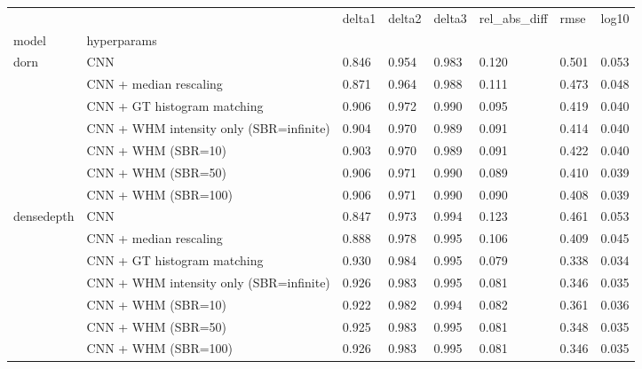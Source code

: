 \begin{tabular}{llllllll}
\toprule
           &                     & delta1 & delta2 & delta3 & rel\_abs\_diff &  rmse & log10 \\
model & hyperparams &        &        &        &              &       &       \\
\midrule
\multirow{7}{*}{dorn} & CNN &  0.846 &  0.954 &  0.983 &        0.120 & 0.501 & 0.053 \\
           & CNN + median rescaling &  0.871 &  0.964 &  0.988 &        0.111 & 0.473 & 0.048 \\
           & CNN + GT histogram matching &  0.906 &  0.972 &  0.990 &        0.095 & 0.419 & 0.040 \\
           & CNN + WHM intensity only (SBR=infinite) &  0.904 &  0.970 &  0.989 &        0.091 & 0.414 & 0.040 \\
           & CNN + WHM (SBR=10) &  0.903 &  0.970 &  0.989 &        0.091 & 0.422 & 0.040 \\
           & CNN + WHM (SBR=50) &  0.906 &  0.971 &  0.990 &        0.089 & 0.410 & 0.039 \\
           & CNN + WHM (SBR=100) &  0.906 &  0.971 &  0.990 &        0.090 & 0.408 & 0.039 \\
\cline{1-8}
\multirow{7}{*}{densedepth} & CNN &  0.847 &  0.973 &  0.994 &        0.123 & 0.461 & 0.053 \\
           & CNN + median rescaling &  0.888 &  0.978 &  0.995 &        0.106 & 0.409 & 0.045 \\
           & CNN + GT histogram matching &  0.930 &  0.984 &  0.995 &        0.079 & 0.338 & 0.034 \\
           & CNN + WHM intensity only (SBR=infinite) &  0.926 &  0.983 &  0.995 &        0.081 & 0.346 & 0.035 \\
           & CNN + WHM (SBR=10) &  0.922 &  0.982 &  0.994 &        0.082 & 0.361 & 0.036 \\
           & CNN + WHM (SBR=50) &  0.925 &  0.983 &  0.995 &        0.081 & 0.348 & 0.035 \\
           & CNN + WHM (SBR=100) &  0.926 &  0.983 &  0.995 &        0.081 & 0.346 & 0.035 \\
\bottomrule
\end{tabular}

